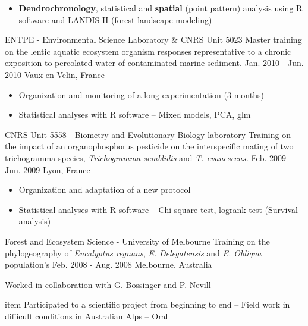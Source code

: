 \begin{cventries}
{\begin{cvitems}
\begin{itemize}[label=$\bullet$,topsep=2pt]
        \item {\textbf{Dendrochronology}, statistical and \textbf{spatial} (point
            pattern) analysis using R software and LANDIS-II (forest landscape
            modeling)}
      \end{itemize}
      \end{cvitems} 
    }
  \cventry
  {ENTPE - Environmental Science Laboratory \& CNRS Unit 5023}
  {Master training on the lentic aquatic ecosystem organism responses representative to a chronic exposition to percolated water of contaminated marine sediment.}
  {Jan. 2010 - Jun. 2010}
    {Vaux-en-Velin, France}
{
  \begin{cvitems}
          \begin{itemize}[label=$\bullet$,topsep=2pt]
    \item {Organization and monitoring of a long experimentation (3 months)}
    \item {Statistical analyses with R software – Mixed models, PCA, glm}
          \end{itemize}
\end{cvitems} 
  }
    \cventry
  {CNRS Unit 5558 - Biometry and Evolutionary Biology laboratory}
  {Training on the impact of an organophosphorus pesticide on the interspecific mating of two trichogramma species, \textit{Trichogramma semblidis} and \textit{T. evanescens.}}
  {Feb. 2009 - Jun. 2009}
    {Lyon, France}
{
  \begin{cvitems}
              \begin{itemize}[label=$\bullet$,topsep=2pt]
    \item {Organization and adaptation of a new protocol}
    \item {Statistical analyses with R software – Chi-square test, logrank test (Survival analysis)}
              \end{itemize}
\end{cvitems} 
  }
      \cventry
  {Forest and Ecosystem Science - University of Melbourne}
  {Training on the phylogeography of \textit{Eucalyptus regnans}, \textit{E. Delegatensis} and \textit{E. Obliqua} population’s}
  {Feb. 2008 - Aug. 2008}
    {Melbourne, Australia}
{
    \begin{cvitems}
    \item []{\textnormal{Worked in collaboration with G. Bossinger and P. Nevill}}
    \              \begin{itemize}[label=$\bullet$,topsep=2pt]
item {Participated to a scientific project from beginning to end
        – Field work in difficult conditions in Australian Alps – Oral
}
\end{itemize}
\end{cvitems}}
\end{cventries}
